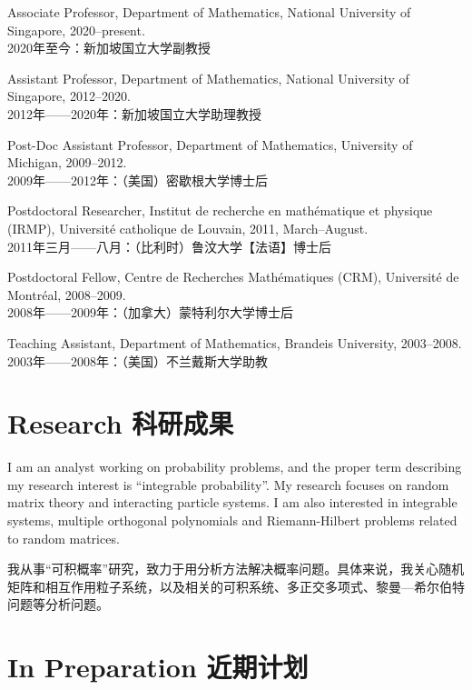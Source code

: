 \documentclass[12pt,a4paper]{article}
\newenvironment{item_list}{
 \begin{list}{}{
   \setlength{\leftmargin}{1.5em}
   \setlength{\itemsep}{0.25em}
   \setlength{\parskip}{0pt}
   \setlength{\parsep}{0.25em}
 }
}{
 \end{list}
}
\begin{document}
\begin{item_list}
\item
  Associate Professor, Department of Mathematics, National University of Singapore, 2020--present. \\
  2020年至今：新加坡国立大学副教授
\item
  Assistant Professor, Department of Mathematics, National University of Singapore, 2012--2020. \\
  2012年——2020年：新加坡国立大学助理教授
\item
  Post-Doc Assistant Professor, Department of Mathematics, University of Michigan,
  2009--2012. \\
  2009年——2012年：（美国）密歇根大学博士后
\item
  Postdoctoral Researcher, Institut de recherche en math\'{e}matique et physique (IRMP), Universit\'{e} catholique de Louvain, 2011, March--August. \\
  2011年三月——八月：（比利时）鲁汶大学【法语】博士后
\item
  Postdoctoral Fellow, Centre de Recherches Math\'{e}matiques (CRM), Universit\'{e} de Montr\'{e}al, 2008--2009. \\
  2008年——2009年：（加拿大）蒙特利尔大学博士后
\item
  Teaching Assistant, Department of Mathematics, Brandeis University, 2003--2008. \\
  2003年——2008年：（美国）不兰戴斯大学助教
\end{item_list}

\section*{Research 科研成果}

I am an analyst working on probability problems, and the proper term describing my research interest is ``integrable probability''. My research focuses on random matrix theory and interacting particle systems. I am also interested in integrable systems, multiple orthogonal polynomials and Riemann-Hilbert problems related to random matrices.

我从事“可积概率”研究，致力于用分析方法解决概率问题。具体来说，我关心随机矩阵和相互作用粒子系统，以及相关的可积系统、多正交多项式、黎曼—希尔伯特问题等分析问题。

\section*{In Preparation 近期计划}
\end{document}
